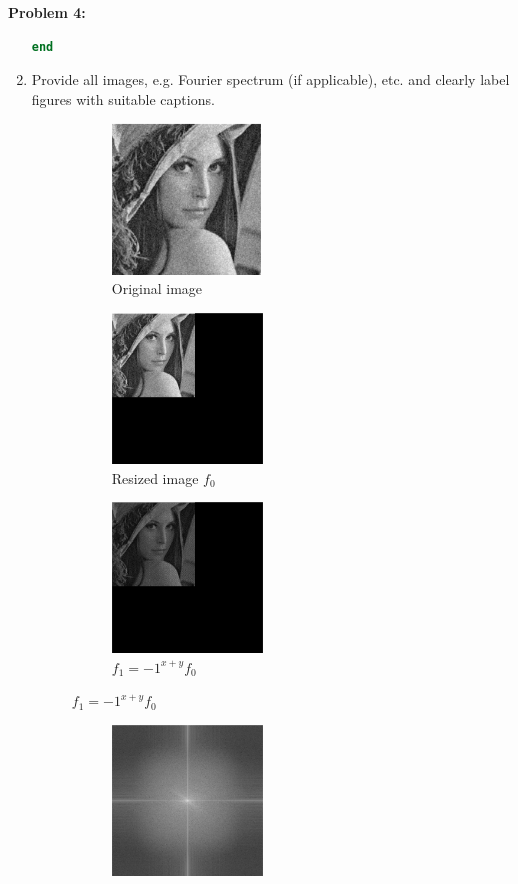 \documentclass[11pt]{article}
\newenvironment{problem}[1]{\textbf{Problem #1: }}{\newpage}
\begin{document}
\begin{problem}{4}
\begin{enumerate}[label = (\alph*)]
\begin{lstlisting}[language=Matlab]
end
\end{lstlisting}
			\newpage
			\item Provide all images, e.g. Fourier spectrum (if applicable), etc. and clearly label figures with suitable captions.
			\begin{figure}[h!]
				\centering
				\begin{subfigure}[h!]{.3\textwidth}
					\centering
					\includegraphics[height = 4cm]{Figures/Prob4/1}
					\caption{Original image}
				\end{subfigure}
				\begin{subfigure}[h!]{.3\textwidth}
					\centering
					\includegraphics[height = 4cm]{Figures/Prob4/2}
					\caption{Resized image $f_0$}
				\end{subfigure}
				\begin{subfigure}[h!]{.3\textwidth}
					\centering
					\includegraphics[height = 4cm]{Figures/Prob4/3}
					\caption{$f_1 = -1^{x+y}f_0$}
				\end{subfigure}
			\end{figure}
			\begin{figure}[h!]
				\centering
				\begin{subfigure}[h!]{.3\textwidth}
					\centering
					\includegraphics[height = 4cm]{Figures/Prob4/4}

\end{subfigure}
\end{figure}
\end{enumerate}
\end{problem}
\end{document}
